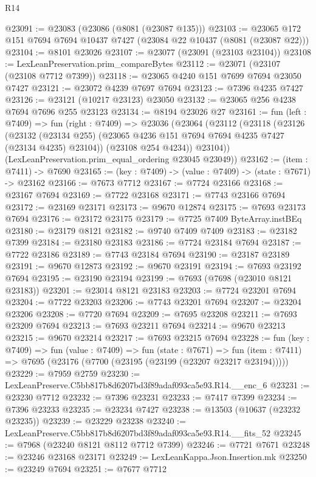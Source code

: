\begin{lexlean}{R14}
\begin{coremodule}
@23091 := @23083 (@23086 (@8081 (@23087 @135)))
@23103 := @23065 @172 @151 @7694 @7694 @10437 @7427 (@23084 @22 @10437 (@8081 (@23087 @22)))
@23104 := @8101 @23026
@23107 := @23077 (@23091 (@23103 @23104))
@23108 := LexLeanPreservation.prim_compareBytes
@23112 := @23071 (@23107 (@23108 @7712 @7399))
@23118 := @23065 @4240 @151 @7699 @7694 @23050 @7427
@23121 := @23072 @4239 @7697 @7694
@23123 := @7396 @4235 @7427
@23126 := @23121 (@10217 @23123) @23050
@23132 := @23065 @256 @4238 @7694 @7696 @255 @23123
@23134 := @8194 @23026 @27
@23161 := fun (left : @7409) =>
  fun (right : @7409) =>
  @23036
    (@23064
      (@23112
        (@23118
          (@23126
            (@23132 (@23134 @255) (@23065 @4236 @151 @7694 @7694 @4235 @7427 (@23134 @4235) @23104))
            (@23108 @254 @4234))
          @23104))
      (LexLeanPreservation.prim_equal_ordering @23045 @23049))
@23162 := (item : @7411) -> @7690
@23165 := (key : @7409) -> (value : @7409) -> (state : @7671) -> @23162
@23166 := @7673 @7712
@23167 := @7724 @23166
@23168 := @23167 @7694
@23169 := @7722 @23168
@23171 := @7743 @23166 @7694
@23172 := @23169 @23171
@23173 := @9670 @12874
@23175 := @7693 @23173 @7694
@23176 := @23172 @23175
@23179 := @7725 @7409 ByteArray.instBEq
@23180 := @23179 @8121
@23182 := @9740 @7409 @7409
@23183 := @23182 @7399
@23184 := @23180 @23183
@23186 := @7724 @23184 @7694
@23187 := @7722 @23186
@23189 := @7743 @23184 @7694
@23190 := @23187 @23189
@23191 := @9670 @12873
@23192 := @9670 @23191
@23194 := @7693 @23192 @7694
@23195 := @23190 @23194
@23199 := @7693 (@7698 (@23010 @8121 @23183))
@23201 := @23014 @8121 @23183
@23203 := @7724 @23201 @7694
@23204 := @7722 @23203
@23206 := @7743 @23201 @7694
@23207 := @23204 @23206
@23208 := @7720 @7694
@23209 := @7695 @23208
@23211 := @7693 @23209 @7694
@23213 := @7693 @23211 @7694
@23214 := @9670 @23213
@23215 := @9670 @23214
@23217 := @7693 @23215 @7694
@23228 := fun (key : @7409) =>
  fun (value : @7409) =>
  fun (state : @7671) =>
  fun (item : @7411) => @7695 (@23176 (@7700 (@23195 (@23199 (@23207 @23217 @23194)))))
@23229 := @7959 @2759
@23230 := LexLeanPreserve.C5bb817b8d6207bd3f89adaf093ca5e93.R14.__enc_6
@23231 := @23230 @7712
@23232 := @7396 @23231
@23233 := @7417 @7399
@23234 := @7396 @23233
@23235 := @23234 @7427
@23238 := @13503 (@10637 (@23232 @23235))
@23239 := @23229 @23238
@23240 := LexLeanPreserve.C5bb817b8d6207bd3f89adaf093ca5e93.R14.__fits_52
@23245 := @7968 (@23240 @8121 @8112 @7712 @7399)
@23246 := @7721 @7671
@23248 := @23246 @23168 @23171
@23249 := LexLeanKappa.Json.Insertion.mk
@23250 := @23249 @7694
@23251 := @7677 @7712

\end{coremodule}
\end{lexlean}
